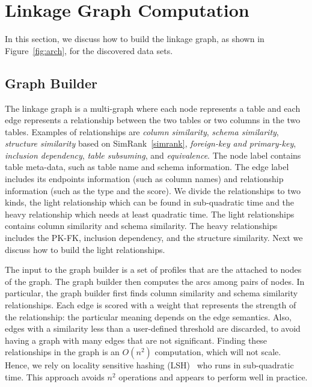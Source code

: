 \section{Linkage Graph Computation}
\label{sec:stitching}

In this section, we discuss how to build the linkage graph, as shown in Figure~\ref{fig:arch}, for the discovered data sets.



\subsection{Graph Builder}



The linkage graph is a multi-graph where each node represents a table and each edge represents a relationship between the two tables or two columns in the two tables. Examples of relationships are \emph{column similarity}, \emph{schema similarity}, \emph{structure similarity} based on SimRank~\ref{simrank}, \emph{foreign-key and primary-key}, \emph{inclusion dependency}, \emph{table subsuming}, and \emph{equivalence}. The node label contains table meta-data, such as table name and schema information. The edge label includes its endpoints information (such as column names) and relationship information (such as the type and the score). We divide the relationships to two kinds, the light relationship which can be found in sub-quadratic time and the heavy relationship which needs at least quadratic time. The light relationships contains column similarity and schema similarity. The heavy relationships includes the PK-FK, inclusion dependency, and the structure similarity. Next we discuss how to build the light relationships.


The input to the graph builder is a set of profiles that are the attached to nodes of the graph. The graph builder then computes the arcs among pairs of nodes. In particular, the graph builder first finds column similarity and schema similarity relationships. Each edge is scored with a weight that represents the strength of the relationship: the particular meaning depends on the edge semantics.  Also, edges with a similarity less than a user-defined threshold are discarded, to avoid having a graph with many edges that are not significant. Finding these relationships in the graph is an $O(n^2)$ computation, which will not scale.  Hence, we rely on locality sensitive hashing (LSH)~\cite{DBLP:conf/compgeom/DatarIIM04} who runs in sub-quadratic time. This approach avoids $n^2$ operations and appears to perform well in practice.



